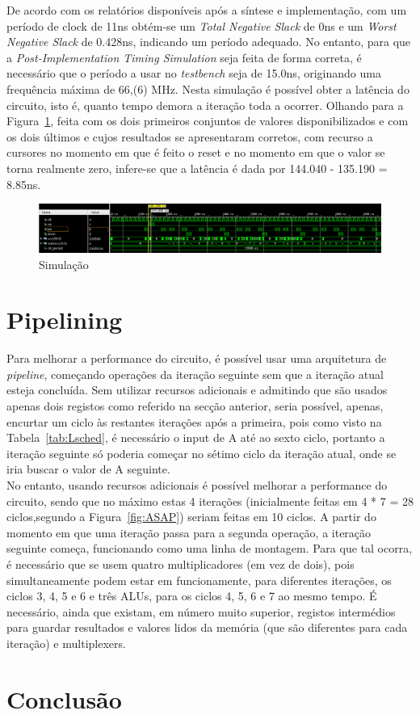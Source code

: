 \documentclass{article} %
\begin{document}
		\noindent De acordo com os relatórios disponíveis após a síntese e implementação, com um período de clock de 11ns obtém-se um \emph{Total Negative Slack} de 0ns e um \emph{Worst Negative Slack} de 0.428ns, indicando um período adequado. No entanto, para que a \emph{Post-Implementation Timing Simulation} seja feita de forma correta, é necessário que o período a usar no \emph{testbench} seja de 15.0ns, originando uma frequência máxima de 66,(6) MHz. Nesta simulação é possível obter a latência do circuito, isto é, quanto tempo demora a iteração toda a ocorrer. Olhando para a Figura~\ref{fig:Sim}, feita com os dois primeiros conjuntos de valores disponibilizados e com os dois últimos e cujos resultados se apresentaram corretos, com recurso a cursores no momento em que é feito o reset e no momento em que o valor se torna realmente zero, infere-se que a latência é dada por 144.040 - 135.190 = 8.85ns.\\ 

		\begin{figure}[ht]
			\begin{center}
				\includegraphics[width=6.5in]{sim.png}
				\caption{Simulação}
				\label{fig:Sim}
			\end{center}
		\end{figure}


	\section{Pipelining}

		Para melhorar a performance do circuito, é possível usar uma arquitetura de \emph{pipeline}, começando operações da iteração seguinte sem que a iteração atual esteja concluída. Sem utilizar recursos adicionais e admitindo que são usados apenas dois registos como referido na secção anterior, seria possível, apenas, encurtar um ciclo às restantes iterações após a primeira, pois como visto na Tabela~\ref{tab:Lsched}, é necessário o input de A até ao sexto ciclo, portanto a iteração seguinte só poderia começar no sétimo ciclo da iteração atual, onde se iria buscar o valor de A seguinte.\\

		\noindent No entanto, usando recursos adicionais é possível melhorar a performance do circuito, sendo que no máximo estas 4 iterações (inicialmente feitas em 4 * 7 = 28 ciclos,segundo a Figura~\ref{fig:ASAP}) seriam feitas em 10 ciclos. A partir do momento em que uma iteração passa para a segunda operação, a iteração seguinte começa, funcionando como uma linha de montagem. Para que tal ocorra, é necessário que se usem quatro multiplicadores (em vez de dois), pois simultaneamente podem estar em funcionamente, para diferentes iterações, os ciclos 3, 4, 5 e 6 e três ALUs, para os ciclos 4, 5, 6 e 7 ao mesmo tempo. É necessário, ainda que existam, em número muito superior, registos intermédios para guardar resultados e valores lidos da memória (que são diferentes para cada iteração) e multiplexers.

	\section{Conclusão}

	
\end{document}
